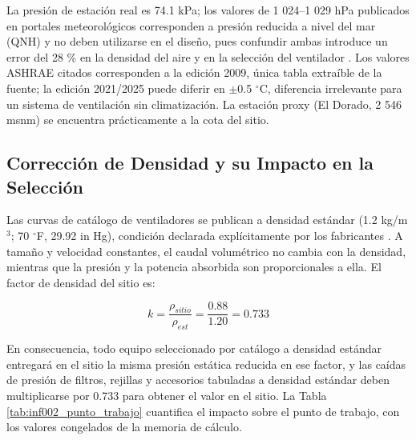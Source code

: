 La presión de estación real es 74.1 kPa; los valores de 1 024--1 029 hPa publicados en portales meteorológicos corresponden a presión reducida a nivel del mar (QNH) y no deben utilizarse en el diseño, pues confundir ambas introduce un error del 28 \% en la densidad del aire y en la selección del ventilador \cite{tutiempo_cajica}. Los valores ASHRAE citados corresponden a la edición 2009, única tabla extraíble de la fuente; la edición 2021/2025 puede diferir en $\pm$0.5 $^{\circ}$C, diferencia irrelevante para un sistema de ventilación sin climatización. La estación proxy (El Dorado, 2 546 msnm) se encuentra prácticamente a la cota del sitio.

\subsection{Corrección de Densidad y su Impacto en la Selección}

Las curvas de catálogo de ventiladores se publican a densidad estándar (1.2 kg/m$^3$; 70 $^{\circ}$F, 29.92 in Hg), condición declarada explícitamente por los fabricantes \cite{tcf_fe1600}. A tamaño y velocidad constantes, el caudal volumétrico no cambia con la densidad, mientras que la presión y la potencia absorbida son proporcionales a ella. El factor de densidad del sitio es:

\begin{equation}
	k = \frac{\rho_{sitio}}{\rho_{est}} = \frac{0.88}{1.20} = 0.733
	\label{eq:inf002_kdensidad}
\end{equation}

En consecuencia, todo equipo seleccionado por catálogo a densidad estándar entregará en el sitio la misma presión estática reducida en ese factor, y las caídas de presión de filtros, rejillas y accesorios tabuladas a densidad estándar deben multiplicarse por 0.733 para obtener el valor en el sitio. La Tabla \ref{tab:inf002_punto_trabajo} cuantifica el impacto sobre el punto de trabajo, con los valores congelados de la memoria de cálculo.

